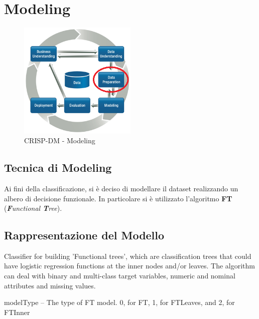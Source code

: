\chapter{Modeling}

\begin{figure}[hbtp]
	\centering
	\includegraphics[width=0.5\textwidth]{./images/CRISPDM_3.png}
	\caption{CRISP-DM - Modeling}
	\label{CRISPDM_4}
\end{figure}

\section{Tecnica di Modeling}
Ai fini della classificazione, si è deciso di modellare il dataset realizzando un albero di decisione funzionale. In particolare si è utilizzato l'algoritmo \textbf{FT} (\textit{\textbf{F}unctional \textbf{T}ree}).

\section{Rappresentazione del Modello}

Classifier for building 'Functional trees', which are classification trees  that could have logistic regression functions at the inner nodes and/or leaves. The algorithm can deal with binary and multi-class target variables, numeric and nominal attributes and missing values.\cite{Gama2004}

modelType -- The type of FT model. 0, for FT, 1, for FTLeaves, and 2, for FTInner


